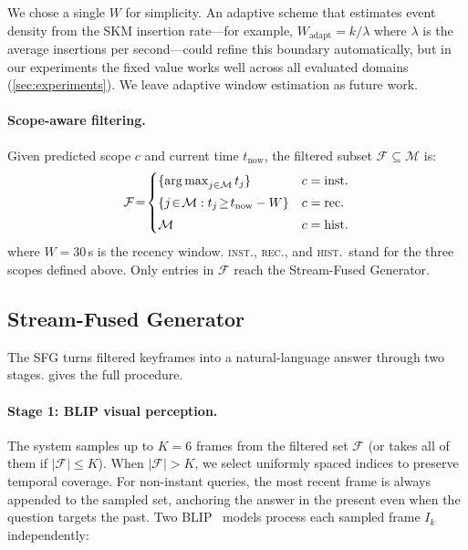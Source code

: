 We chose a single $W$ for simplicity.
An adaptive scheme that estimates event density from the SKM insertion rate---for example, $W_{\text{adapt}} = k / \lambda$ where $\lambda$ is the average insertions per second---could refine this boundary automatically, but in our experiments the fixed value works well across all evaluated domains (\cref{sec:experiments}).
We leave adaptive window estimation as future work.

\paragraph{Scope-aware filtering.}
Given predicted scope $c$ and current time $t_{\text{now}}$, the filtered subset $\mathcal{F} \subseteq \mathcal{M}$ is:
\begin{equation}
  \mathcal{F} \!=\!
  \begin{cases}
    \{\operatorname*{arg\,max}_{j \in \mathcal{M}} t_j\}                        & c = \text{inst.} \\[3pt]
    \{j \!\in\! \mathcal{M} : t_j \!\ge\! t_{\text{now}} - W\} & c = \text{rec.}  \\[3pt]
    \mathcal{M}                                                 & c = \text{hist.}
  \end{cases}
  \label{eq:scope_filter}
\end{equation}
where $W = 30$\,s is the recency window. \textsc{inst.}, \textsc{rec.}, and \textsc{hist.}\ stand for the three scopes defined above. Only entries in $\mathcal{F}$ reach the Stream-Fused Generator.


\subsection{Stream-Fused Generator}
\label{sec:sfg}

The SFG turns filtered keyframes into a natural-language answer through two stages.  gives the full procedure.

\paragraph{Stage 1: BLIP visual perception.}
The system samples up to $K\!=\!6$ frames from the filtered set $\mathcal{F}$ (or takes all of them if $|\mathcal{F}| \le K$).
When $|\mathcal{F}| > K$, we select uniformly spaced indices to preserve temporal coverage.
For non-instant queries, the most recent frame is always appended to the sampled set, anchoring the answer in the present even when the question targets the past.
Two BLIP~\cite{li2022blip} models process each sampled frame $I_k$ independently:

